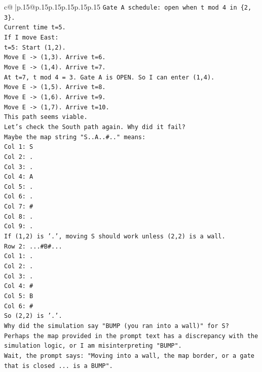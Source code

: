 \documentclass{article}
\begin{document}
{\begin{supertabular}{c@{$\;$}|p{.15\linewidth}@{}p{.15\linewidth}p{.15\linewidth}p{.15\linewidth}p{.15\linewidth}p{.15\linewidth}}
{{{\texttt{Gate A schedule: open when t mod 4 in \{2, 3\}.} \\
\texttt{Current time t=5.} \\
\texttt{If I move East:} \\
\texttt{t=5: Start (1,2).} \\
\texttt{Move E {-}> (1,3). Arrive t=6.} \\
\texttt{Move E {-}> (1,4). Arrive t=7.} \\
\texttt{At t=7, t mod 4 = 3. Gate A is OPEN. So I can enter (1,4).} \\
\texttt{Move E {-}> (1,5). Arrive t=8.} \\
\texttt{Move E {-}> (1,6). Arrive t=9.} \\
\texttt{Move E {-}> (1,7). Arrive t=10.} \\
\texttt{This path seems viable.} \\
\texttt{Let's check the South path again. Why did it fail?} \\
\texttt{Maybe the map string "S..A..\#.." means:} \\
\texttt{Col 1: S} \\
\texttt{Col 2: .} \\
\texttt{Col 3: .} \\
\texttt{Col 4: A} \\
\texttt{Col 5: .} \\
\texttt{Col 6: .} \\
\texttt{Col 7: \#} \\
\texttt{Col 8: .} \\
\texttt{Col 9: .} \\
\texttt{If (1,2) is '.', moving S should work unless (2,2) is a wall.} \\
\texttt{Row 2: ...\#B\#...} \\
\texttt{Col 1: .} \\
\texttt{Col 2: .} \\
\texttt{Col 3: .} \\
\texttt{Col 4: \#} \\
\texttt{Col 5: B} \\
\texttt{Col 6: \#} \\
\texttt{So (2,2) is '.'.} \\
\texttt{Why did the simulation say "BUMP (you ran into a wall)" for S?} \\
\texttt{Perhaps the map provided in the prompt text has a discrepancy with the simulation logic, or I am misinterpreting "BUMP".} \\
\texttt{Wait, the prompt says: "Moving into a wall, the map border, or a gate that is closed ... is a BUMP".} \\
}}}
\end{supertabular}}
\end{document}
